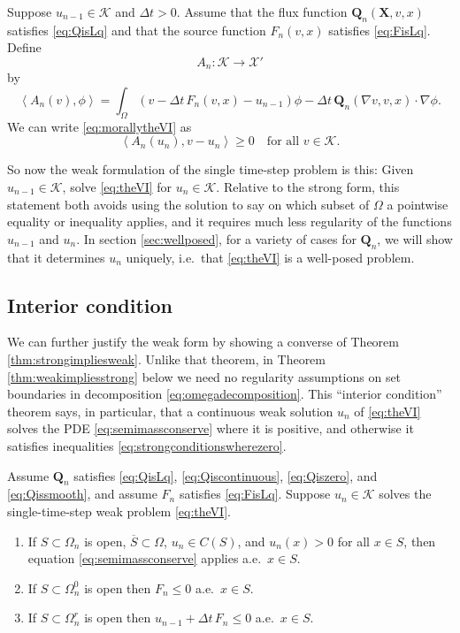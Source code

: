 \documentclass[final,leqno,onefignum,onetabnum]{siamltex1213bueler}
\newcommand\bQ{\mathbf{Q}}
\newcommand\bX{\mathbf{X}}
\renewcommand{\grad}{\nabla}
\newcommand{\ip}[2]{\ensuremath{\left<#1,#2\right>}}
\begin{document}
\medskip
\begin{definition}  Suppose $u_{n-1}\in\mathcal{K}$ and $\Delta t>0$.  Assume that the flux function $\bQ_n(\bX,v,x)$ satisfies \eqref{eq:QisLq} and that the source function $F_n(v,x)$ satisfies \eqref{eq:FisLq}.  Define
    $$A_n:\mathcal{K} \to \mathcal{X}'$$
by
\begin{equation}
  \ip{A_n(v)}{\phi} = \int_\Omega \left(v - \Delta t\, F_n(v,x) - u_{n-1}\right)\phi - \Delta t\, \bQ_n(\grad v,v,x) \cdot \grad\phi. \label{eq:defineAn}
\end{equation}
We can write \eqref{eq:morallytheVI} as
\begin{equation}
  \ip{A_n(u_n)}{v-u_n} \ge 0 \quad \text{for all $v \in \mathcal{K}$.}\label{eq:theVI}
\end{equation}
\end{definition}

So now the weak formulation of the single time-step problem is this:  Given $u_{n-1}\in\mathcal{K}$, solve \eqref{eq:theVI} for $u_n\in\mathcal{K}$.  Relative to the strong form, this statement both avoids using the solution to say on which subset of $\Omega$ a pointwise equality or inequality applies, and it requires much less regularity of the functions $u_{n-1}$ and $u_n$.  In section \ref{sec:wellposed}, for a variety of cases for $\bQ_n$, we will show that it determines $u_n$ uniquely, i.e.~that \eqref{eq:theVI} is a well-posed problem.

\subsection{Interior condition}  \label{subsec:interior}  We can further justify the weak form by showing a converse of Theorem \ref{thm:strongimpliesweak}.  Unlike that theorem, in Theorem \ref{thm:weakimpliesstrong} below we need no regularity assumptions on set boundaries in decomposition \eqref{eq:omegadecomposition}.  This ``interior condition'' theorem says, in particular, that a continuous weak solution $u_n$ of \eqref{eq:theVI} solves the PDE \eqref{eq:semimassconserve} where it is positive, and otherwise it satisfies inequalities \eqref{eq:strongconditionswherezero}.

\medskip
\begin{theorem} \label{thm:weakimpliesstrong}  Assume $\bQ_n$ satisfies \eqref{eq:QisLq}, \eqref{eq:Qiscontinuous}, \eqref{eq:Qiszero}, and \eqref{eq:Qissmooth}, and assume $F_n$ satisfies \eqref{eq:FisLq}.  Suppose $u_n\in\mathcal{K}$ solves the single-time-step weak problem \eqref{eq:theVI}.
\renewcommand{\labelenumi}{\emph{(\roman{enumi})}}
\begin{enumerate}
\item If $S \subset \Omega_n$ is open, $\overline{S}\subset \Omega$, $u_n\in C(S)$, and $u_n(x)>0$ for all $x\in S$, then equation \eqref{eq:semimassconserve} applies a.e.~$x\in S$.
\item If $S \subset \Omega_n^0$ is open then $F_n \le 0$ a.e.~$x\in S$.
\item If $S \subset \Omega_n^r$ is open then $u_{n-1} + \Delta t\,F_n \le 0$ a.e.~$x\in S$.
\end{enumerate}
\end{theorem}
\end{document}
